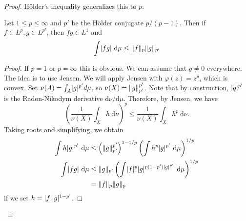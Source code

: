 \documentclass[10pt, twoside]{article}
\renewcommand{\d}{\ \mathrm{d}}
\begin{document}
\begin{thm}
\begin{proof}
            
            H\"older's inequality generalizes this to $p$:
            \begin{mdframed}[style=default]
                \begin{thm}
                Let $1 \leq p \leq \infty$ and $p'$ be the H\"older conjugate $p/(p-1)$. Then if $f \in L^p, g \in L^{p'}$, then $fg \in L^1$ and
                \[ \int \abs{fg} \d \mu \leq \norm{f}_p \norm{g}_{p'} \]
            \end{thm}
            \begin{proof}
                If $p=1$ or $p = \infty$ this is obvious. We can assume that $g \neq 0$ everywhere. The idea is to use Jensen. We will apply Jensen with $\varphi(z) = z^p$, which is convex. Set $\nu(A) = \int_A \lvert g\rvert^{p'} d \mu$, so $\nu(X) = \lVert g\rVert_{p'}^{p'}$. Note that by construction, $\lvert g\rvert^{p'}$ is the Radon-Nikodym derivative $\mathrm{d}\nu/\mathrm{d}\mu$. Therefore, by Jensen, we have
                \[\left( \frac{1}{\nu(X)} \int_X h \d \nu \right)^p \leq \frac{1}{\nu(X)} \int_X h^p \d \nu.\] Taking roots and simplifying, we obtain
                \begin{align*}
                    \int h\abs{g}^{p'} \d \mu &\leq \left( \norm{g}_{p'}^{p'} \right)^{1-1/p} \left( \int h^p \abs{g}^{p'} \d \mu \right)^{1/p} \\
                    \int \abs{fg} \d \mu &\leq \norm{g}_{p'} \left( \int \abs{f}^p \abs{g}^{p(1-p') \abs{g}^{p'}} \d \mu \right)^{1/p} \\
                                         &= \norm{f}_p\norm{g}_p
                \end{align*}
                if we set $h = \lvert f\rvert\lvert g\rvert^{1-p'}$.
            \end{proof}
            \end{mdframed}


\end{proof}
\end{thm}
\end{document}
